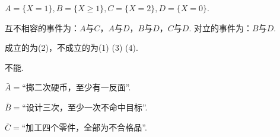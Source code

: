\begin{answer}
  \item $A=\{X=1\},B=\{X\ge1\},C=\{X=2\},D=\{X=0\}$.

  互不相容的事件为：$A$与$C$，$A$与$D$，$B$与$D$，$C$与$D$. 对立的事件为：$B$与$D$.

  \item 成立的为(2)，不成立的为(1) (3) (4).
  \item 不能.
  \item \begin{enumerate*}
    \item $\bar A=$“掷二次硬币，至少有一反面”.
    \item $\bar B=$“设计三次，至少一次不命中目标”.
    \item $\bar C=$“加工四个零件，全部为不合格品”.
  \end{enumerate*}
\end{answer}

